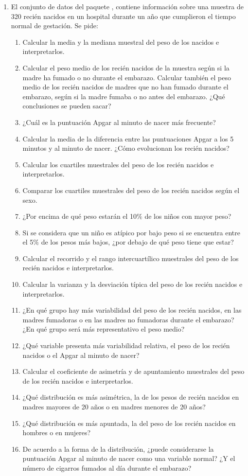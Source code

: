 \begin{enumerate}[leftmargin=*]
\item El conjunto de datos  del paquete , contiene información sobre una
muestra de 320 recién nacidos en un hospital durante un año que cumplieron el tiempo normal de gestación. 
Se pide:
\begin{enumerate}
\item Calcular la media y la mediana muestral del peso de los nacidos e interpretarlos. 
\item Calcular el peso medio de los recién nacidos de la muestra según si la madre ha fumado o no durante el embarazo.
Calcular también el peso medio de los recién nacidos de madres que no han fumado durante el embarazo, según si la madre
fumaba o no antes del embarazo. ¿Qué conclusiones se pueden sacar?
\item ¿Cuál es la puntuación Apgar al minuto de nacer más frecuente?
\item Calcular la media de la diferencia entre las puntuaciones Apgar a los 5 minutos y al minuto de nacer. ¿Cómo
evolucionan los recién nacidos?
\item Calcular los cuartiles muestrales del peso de los recién nacidos e interpretarlos.
\item Comparar los cuartiles muestrales del peso de los recién nacidos según el sexo. 
\item ¿Por encima de qué peso estarán el 10\% de los niños con mayor peso?
\item Si se considera que un niño es atípico por bajo peso si se encuentra entre el 5\% de los pesos más bajos, ¿por
debajo de qué peso tiene que estar?
\item Calcular el recorrido y el rango intercuartílico muestrales del peso de los recién nacidos e interpretarlos.
\item Calcular la varianza y la desviación típica del peso de los recién nacidos e interpretarlos.
\item ¿En qué grupo hay más variabilidad del peso de los recién nacidos, en las madres fumadoras o en las madres no
fumadoras durante el embarazo? ¿En qué grupo será más representativo el peso medio?
\item ¿Qué variable presenta más variabilidad relativa, el peso de los recién nacidos o el Apgar al minuto de nacer?
\item Calcular el coeficiente de asimetría y de apuntamiento muestrales del peso de los recién nacidos e interpretarlos.
\item ¿Qué distribución es más asimétrica, la de los pesos de recién nacidos en madres mayores de 20 años o en madres
menores de 20 años?
\item ¿Qué distribución es más apuntada, la del peso de los recién nacidos en hombres o en mujeres?
\item De acuerdo a la forma de la distribución, ¿puede considerarse la puntuación Apgar al minuto de nacer como una
variable normal? ¿Y el número de cigarros fumados al día durante el embarazo?
\end{enumerate}


\end{enumerate}
